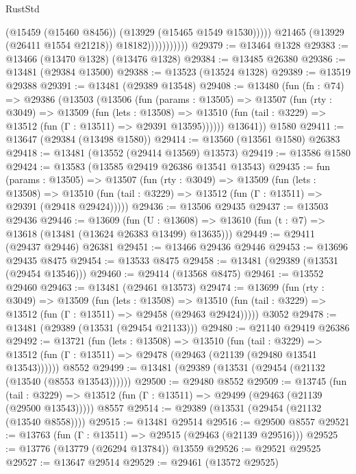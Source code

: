 \begin{lexlean}{RustStd}
\begin{coremodule}
                                (@15459 (@15460 @8456))
                                (@13929 (@15465 @1549 @1530)))))
                          @21465
                          (@13929 (@26411 @1554 @21218))
                          @18182)))))))))))
@29379 := @13464 @1328
@29383 := @13466 (@13470 @1328) (@13476 @1328)
@29384 := @13485 @26380
@29386 := @13481 (@29384 @13500)
@29388 := @13523 (@13524 @1328)
@29389 := @13519 @29388
@29391 := @13481 (@29389 @13548)
@29408 := @13480
    (fun (fn : @74) =>
    @29386
      (@13503
        (@13506
          (fun (params : @13505) =>
          @13507
            (fun (rty : @3049) =>
            @13509
              (fun (lets : @13508) =>
              @13510 (fun (tail : @3229) => @13512 (fun (Γ : @13511) => @29391 @13595))))))
        @13641))
    @1580
@29411 := @13647 (@29384 (@13498 @1580))
@29414 := @13560 (@13561 @1580) @26383
@29418 := @13481 (@13552 (@29414 @13569) @13573)
@29419 := @13586 @1580
@29424 := @13583 (@13585 @29419 @26386 @13541 @13543)
@29435 := fun (params : @13505) =>
  @13507
    (fun (rty : @3049) =>
    @13509
      (fun (lets : @13508) =>
      @13510 (fun (tail : @3229) => @13512 (fun (Γ : @13511) => @29391 (@29418 @29424)))))
@29436 := @13506 @29435
@29437 := @13503 @29436
@29446 := @13609
    (fun (U : @13608) => @13610 (fun (t : @7) => @13618 (@13481 (@13624 @26383 @13499) @13635)))
@29449 := @29411 (@29437 @29446) @26381
@29451 := @13466 @29436 @29446
@29453 := @13696 @29435 @8475
@29454 := @13533 @8475
@29458 := @13481 (@29389 (@13531 (@29454 @13546)))
@29460 := @29414 (@13568 @8475)
@29461 := @13552 @29460
@29463 := @13481 (@29461 @13573)
@29474 := @13699
    (fun (rty : @3049) =>
    @13509
      (fun (lets : @13508) =>
      @13510 (fun (tail : @3229) => @13512 (fun (Γ : @13511) => @29458 (@29463 @29424)))))
    @3052
@29478 := @13481 (@29389 (@13531 (@29454 @21133)))
@29480 := @21140 @29419 @26386
@29492 := @13721
    (fun (lets : @13508) =>
    @13510
      (fun (tail : @3229) =>
      @13512 (fun (Γ : @13511) => @29478 (@29463 (@21139 (@29480 @13541 @13543))))))
    @8552
@29499 := @13481 (@29389 (@13531 (@29454 (@21132 (@13540 (@8553 @13543))))))
@29500 := @29480 @8552
@29509 := @13745
    (fun (tail : @3229) => @13512 (fun (Γ : @13511) => @29499 (@29463 (@21139 (@29500 @13543)))))
    @8557
@29514 := @29389 (@13531 (@29454 (@21132 (@13540 @8558))))
@29515 := @13481 @29514
@29516 := @29500 @8557
@29521 := @13763 (fun (Γ : @13511) => @29515 (@29463 (@21139 @29516)))
@29525 := @13776 (@13779 (@26294 @13784)) @13559
@29526 := @29521 @29525
@29527 := @13647 @29514
@29529 := @29461 (@13572 @29525)

\end{coremodule}
\end{lexlean}
